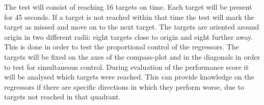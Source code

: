 The test will consist of reaching 16 targets on time. Each target will be present for 45 seconds. If a target is not reached within that time the test will mark the target as missed and move on to the next target. The targets are oriented around origin in two different radii: eight targets close to origin and eight further away. This is done in order to test the proportional control of the regressors. The targets will be fixed on the axes of the compass-plot and in the diagonals in order to test for simultaneous control. 
During evaluation of the performance score it will be analysed which targets were reached. This can provide knowledge on the regressors if there are specific directions in which they perform worse, due to targets not reached in that quadrant. 


%
%
%

